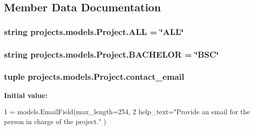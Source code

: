 \subsection{Member Data Documentation}
\hypertarget{classprojects_1_1models_1_1_project_a1abb3db31156e503feeab76b92ad3915}{
\subsubsection[{A\-L\-L}]{\setlength{\rightskip}{0pt plus 5cm}string projects.\-models.\-Project.\-A\-L\-L = \char`\"{}A\-L\-L\char`\"{}\hspace{0.3cm}{\ttfamily [static]}}}\label{classprojects_1_1models_1_1_project_a1abb3db31156e503feeab76b92ad3915}
\hypertarget{classprojects_1_1models_1_1_project_aa7280baf9a6ecb59f892c5d3e7ad4345}{
\subsubsection[{B\-A\-C\-H\-E\-L\-O\-R}]{\setlength{\rightskip}{0pt plus 5cm}string projects.\-models.\-Project.\-B\-A\-C\-H\-E\-L\-O\-R = \char`\"{}B\-S\-C\char`\"{}\hspace{0.3cm}{\ttfamily [static]}}}\label{classprojects_1_1models_1_1_project_aa7280baf9a6ecb59f892c5d3e7ad4345}
\hypertarget{classprojects_1_1models_1_1_project_aa04216a538c373eb1c53f638e025d49a}{
\subsubsection[{contact\-\_\-email}]{\setlength{\rightskip}{0pt plus 5cm}tuple projects.\-models.\-Project.\-contact\-\_\-email\hspace{0.3cm}{\ttfamily [static]}}}\label{classprojects_1_1models_1_1_project_aa04216a538c373eb1c53f638e025d49a}
{\bfseries Initial value\-:}
\begin{DoxyCode}
1 = models.EmailField(max\_length=254,
2                                       help\_text=\textcolor{stringliteral}{"Provide an email for the person in charge of the project."}
      )
\end{DoxyCode}
